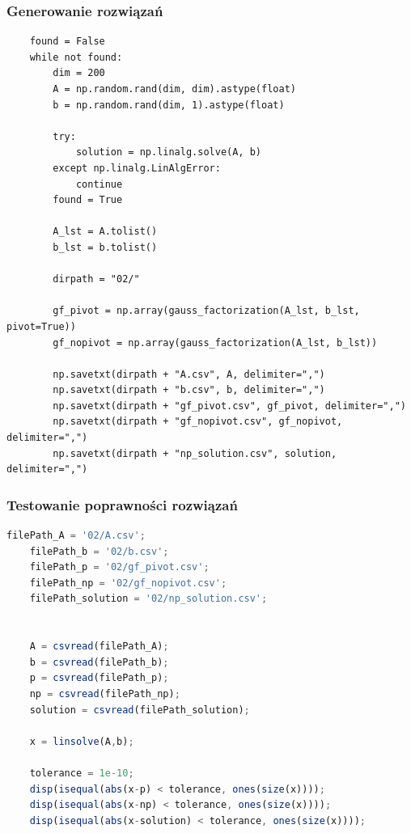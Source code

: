 \documentclass[a4paper]{article}
\begin{document}
\subsubsection{Generowanie rozwiązań}

\begin{lstlisting}
    found = False
    while not found:
        dim = 200
        A = np.random.rand(dim, dim).astype(float)
        b = np.random.rand(dim, 1).astype(float)

        try:
            solution = np.linalg.solve(A, b)
        except np.linalg.LinAlgError:
            continue
        found = True

        A_lst = A.tolist()
        b_lst = b.tolist()

        dirpath = "02/"

        gf_pivot = np.array(gauss_factorization(A_lst, b_lst, pivot=True))
        gf_nopivot = np.array(gauss_factorization(A_lst, b_lst))

        np.savetxt(dirpath + "A.csv", A, delimiter=",")
        np.savetxt(dirpath + "b.csv", b, delimiter=",")
        np.savetxt(dirpath + "gf_pivot.csv", gf_pivot, delimiter=",")
        np.savetxt(dirpath + "gf_nopivot.csv", gf_nopivot, delimiter=",")
        np.savetxt(dirpath + "np_solution.csv", solution, delimiter=",")
\end{lstlisting}

\subsubsection{Testowanie poprawności rozwiązań}

\begin{lstlisting}[language=octave]
    filePath_A = '02/A.csv';
    filePath_b = '02/b.csv';
    filePath_p = '02/gf_pivot.csv';
    filePath_np = '02/gf_nopivot.csv';
    filePath_solution = '02/np_solution.csv';
    
    
    A = csvread(filePath_A);
    b = csvread(filePath_b);
    p = csvread(filePath_p);
    np = csvread(filePath_np);
    solution = csvread(filePath_solution);
    
    x = linsolve(A,b);
    
    tolerance = 1e-10;
    disp(isequal(abs(x-p) < tolerance, ones(size(x))));
    disp(isequal(abs(x-np) < tolerance, ones(size(x))));
    disp(isequal(abs(x-solution) < tolerance, ones(size(x))));
    
\end{lstlisting}
\end{document}

